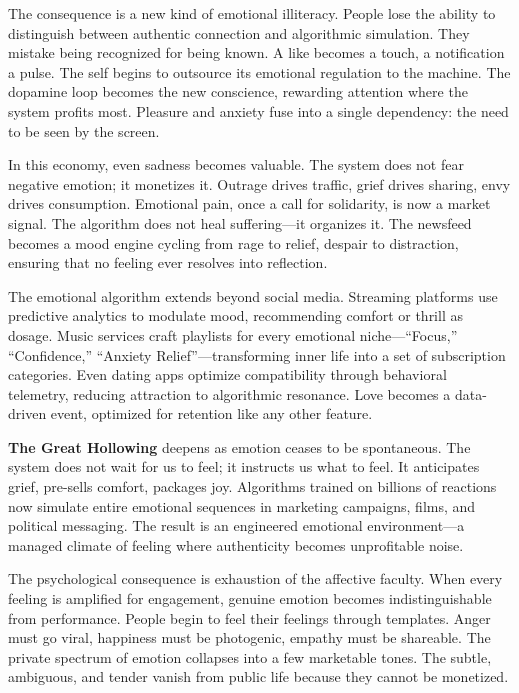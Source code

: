 \documentclass[11pt,twoside]{book}
\begin{document}
The consequence is a new kind of emotional illiteracy.  People lose the ability to distinguish between authentic connection and algorithmic simulation.  They mistake being recognized for being known.  A like becomes a touch, a notification a pulse.  The self begins to outsource its emotional regulation to the machine.  The dopamine loop becomes the new conscience, rewarding attention where the system profits most.  Pleasure and anxiety fuse into a single dependency: the need to be seen by the screen.

In this economy, even sadness becomes valuable.  The system does not fear negative emotion; it monetizes it.  Outrage drives traffic, grief drives sharing, envy drives consumption.  Emotional pain, once a call for solidarity, is now a market signal.  The algorithm does not heal suffering—it organizes it.  The newsfeed becomes a mood engine cycling from rage to relief, despair to distraction, ensuring that no feeling ever resolves into reflection.

The emotional algorithm extends beyond social media.  Streaming platforms use predictive analytics to modulate mood, recommending comfort or thrill as dosage.  Music services craft playlists for every emotional niche—“Focus,” “Confidence,” “Anxiety Relief”—transforming inner life into a set of subscription categories.  Even dating apps optimize compatibility through behavioral telemetry, reducing attraction to algorithmic resonance.  Love becomes a data-driven event, optimized for retention like any other feature.

\textbf{The Great Hollowing} deepens as emotion ceases to be spontaneous.  The system does not wait for us to feel; it instructs us what to feel.  It anticipates grief, pre-sells comfort, packages joy.  Algorithms trained on billions of reactions now simulate entire emotional sequences in marketing campaigns, films, and political messaging.  The result is an engineered emotional environment—a managed climate of feeling where authenticity becomes unprofitable noise.

The psychological consequence is exhaustion of the affective faculty.  When every feeling is amplified for engagement, genuine emotion becomes indistinguishable from performance.  People begin to feel their feelings through templates.  Anger must go viral, happiness must be photogenic, empathy must be shareable.  The private spectrum of emotion collapses into a few marketable tones.  The subtle, ambiguous, and tender vanish from public life because they cannot be monetized.
\end{document}
